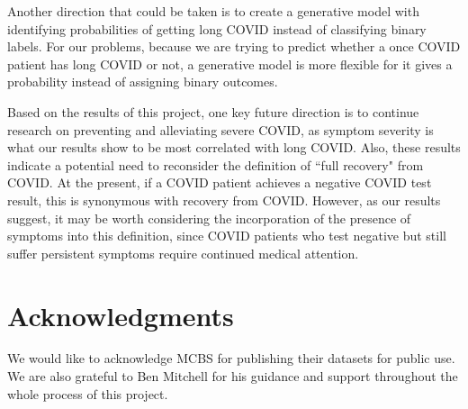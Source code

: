 \documentclass{article}
\begin{document}
Another direction that could be taken is to create a generative model with identifying probabilities of getting long COVID instead of classifying binary labels. For our problems, because we are trying to predict whether a once COVID patient has long COVID or not, a generative model is more flexible for it gives a probability instead of assigning binary outcomes.

Based on the results of this project, one key future direction is to continue research on preventing and alleviating severe COVID, as symptom severity is what our results show to be most correlated with long COVID.
Also, these results indicate a potential need to reconsider the definition of ``full recovery" from COVID. At the present, if a COVID patient achieves a negative COVID test result, this is synonymous with recovery from COVID. However, as our results suggest, it may be worth considering the incorporation of the presence of symptoms into this definition, since COVID patients who test negative but still suffer persistent symptoms require continued medical attention.

\section*{Acknowledgments}


We would like to acknowledge MCBS for publishing their datasets for public use. We are also grateful to Ben Mitchell for his guidance and support throughout the whole process of this project. 





\nocite{apalongCOVID}
\nocite{langley00}
\nocite{CDC}
\nocite{DAVIS2021101019}
\nocite{10.1001/jama.2020.12603}
\nocite{ssrn}
\nocite{Osmanov2101341}
\nocite{Nabavim3489}
\nocite{Strobl2007}
\nocite{scikit-learn}
\nocite{10.2307/352104} 
\nocite{10.2307/1403452} 
\nocite{Cortes1995}
\nocite{Quinlan1986}
\nocite{Breiman2001}
\nocite{Menze2009}








\end{document}
